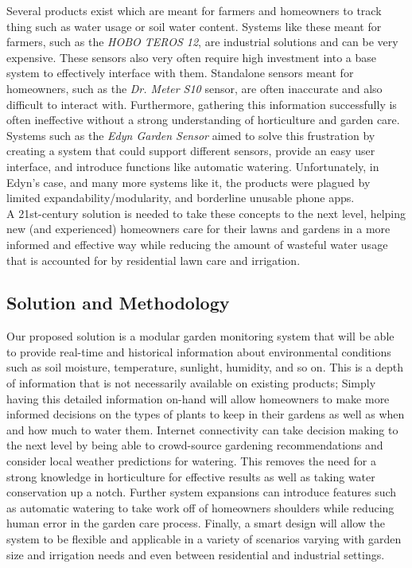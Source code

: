 \documentclass[]{article}
\begin{document}
Several products exist which are meant for farmers and homeowners to track thing such as water usage or soil water content. Systems like these meant for farmers, such as the \textit{HOBO TEROS 12}, are industrial solutions and can be very expensive. These sensors also very often require high investment into a base system to effectively interface with them. Standalone sensors meant for homeowners, such as the \textit{Dr. Meter S10} sensor, are often inaccurate and also difficult to interact with. Furthermore, gathering this information successfully is often ineffective without a strong understanding of horticulture and garden care.\\

Systems such as the \textit{Edyn Garden Sensor} aimed to solve this frustration by creating a system that could support different sensors, provide an easy user interface, and introduce functions like automatic watering. Unfortunately, in Edyn's case, and many more systems like it, the products were plagued by limited expandability/modularity, and borderline unusable phone apps.\\

A 21st-century solution is needed to take these concepts to the next level, helping new (and experienced) homeowners care for their lawns and gardens in a more informed and effective way while reducing the amount of wasteful water usage that is accounted for by residential lawn care and irrigation.
\subsection*{Solution and Methodology}

Our proposed solution is a modular garden monitoring system that will be able to provide real-time and historical information about environmental conditions such as soil moisture, temperature, sunlight, humidity, and so on. This is a depth of information that is not necessarily available on existing products; Simply having this detailed information on-hand will allow homeowners to make more informed decisions on the types of plants to keep in their gardens as well as when and how much to water them. Internet connectivity can take decision making to the next level by being able to crowd-source gardening recommendations and consider local weather predictions for watering. This removes the need for a strong knowledge in horticulture for effective results as well as taking water conservation up a notch. Further system expansions can introduce features such as automatic watering to take work off of homeowners shoulders while reducing human error in the garden care process. Finally, a smart design will allow the system to be flexible and applicable in a variety of scenarios varying with garden size and irrigation needs and even between residential and industrial settings.\\
\end{document}
